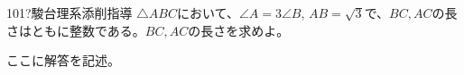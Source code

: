 \begin{thm}{101}{\hosi ?}{駿台理系添削指導}
 $\triangle{ABC}$において、$\angle{A}=3\angle{B}$, $AB=\sqrt{3}$で、$BC, AC$の長さはともに整数である。$BC, AC$の長さを求めよ。
\end{thm}


ここに解答を記述。